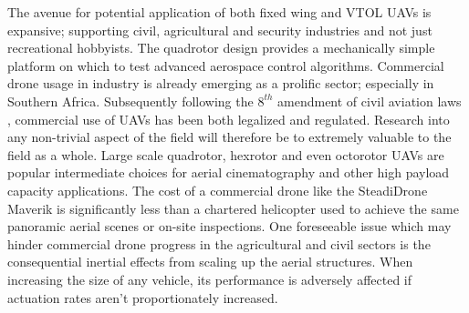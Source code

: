 \par
The avenue for potential application of both fixed wing and VTOL UAVs is expansive; supporting civil\cite{civilquadcopter}, agricultural\cite{agriculturequadcopter} and security\cite{videosurveillancequadcopter} industries and not just recreational hobbyists. The quadrotor design provides a mechanically simple platform on which to test advanced aerospace control algorithms. Commercial drone usage in industry is already emerging as a prolific sector; especially in Southern Africa. Subsequently following the $8^{th}$ amendment of civil aviation laws \cite{dronelaw}, commercial use of UAVs has been both legalized and regulated. Research into any non-trivial aspect of the field will therefore be to extremely valuable to the field as a whole. Large scale quadrotor, hexrotor and even octorotor UAVs are popular intermediate choices for aerial cinematography and other high payload capacity applications. The cost of a commercial drone like the SteadiDrone Maverik \cite{steadidrone} is significantly less than a chartered helicopter used to achieve the same panoramic aerial scenes or on-site inspections. One foreseeable issue which may hinder commercial drone progress in the agricultural and civil sectors is the consequential inertial effects from scaling up the aerial structures. When increasing the size of any vehicle, its performance is adversely affected if actuation rates aren't proportionately increased.
